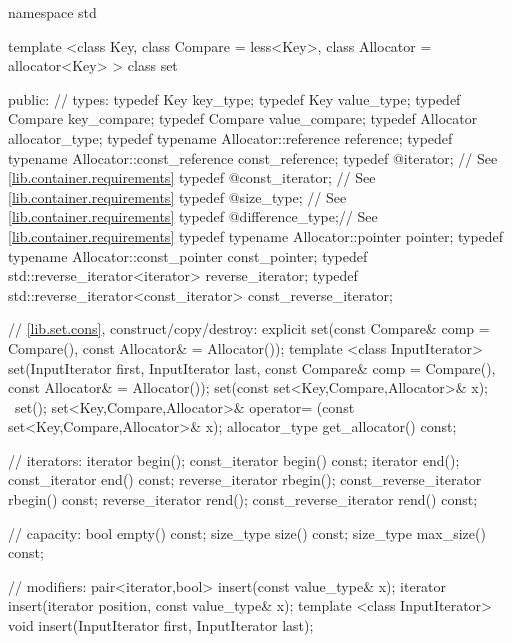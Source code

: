 \begin{codeblock}
namespace std {
  template <class Key, class Compare = less<Key>,
            class Allocator = allocator<Key> >
  class set {
  public:
    // types:
    typedef Key                                   key_type;
    typedef Key                                   value_type;
    typedef Compare                               key_compare;
    typedef Compare                               value_compare;
    typedef Allocator                             allocator_type;
    typedef typename Allocator::reference         reference;
    typedef typename Allocator::const_reference   const_reference;
    typedef @\impdef@                iterator;       // See \ref{lib.container.requirements}
    typedef @\impdef@                const_iterator; // See \ref{lib.container.requirements}
    typedef @\impdef@                size_type;      // See \ref{lib.container.requirements}
    typedef @\impdef@                difference_type;// See \ref{lib.container.requirements}
    typedef typename Allocator::pointer           pointer;
    typedef typename Allocator::const_pointer     const_pointer;
    typedef std::reverse_iterator<iterator>       reverse_iterator;
    typedef std::reverse_iterator<const_iterator> const_reverse_iterator;

    // \ref{lib.set.cons}, construct/copy/destroy:
    explicit set(const Compare& comp = Compare(),
                 const Allocator& = Allocator());
    template <class InputIterator>
      set(InputIterator first, InputIterator last,
          const Compare& comp = Compare(), const Allocator& = Allocator());
    set(const set<Key,Compare,Allocator>& x);
   ~set();
    set<Key,Compare,Allocator>& operator=
      (const set<Key,Compare,Allocator>& x);
    allocator_type get_allocator() const;

    // iterators:
    iterator               begin();
    const_iterator         begin() const;
    iterator               end();
    const_iterator         end() const;
    reverse_iterator       rbegin();
    const_reverse_iterator rbegin() const;
    reverse_iterator       rend();
    const_reverse_iterator rend() const;

    // capacity:
    bool          empty() const;
    size_type     size() const;
    size_type     max_size() const;

    // modifiers:
    pair<iterator,bool> insert(const value_type& x);
    iterator            insert(iterator position, const value_type& x);
    template <class InputIterator>
        void insert(InputIterator first, InputIterator last);

}}
\end{codeblock}
